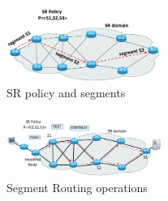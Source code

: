 \begin{figure}
    \centering
    \includegraphics[width=0.45\textwidth]{fig/sr-domain-simple.pdf}
    \caption{SR policy and segments}
    \label{fig:sr_policy_and_segments}
    \vspace{-3ex}
\end{figure}


\begin{figure}
    \centering
    \includegraphics[width=0.45\textwidth]{fig/sr-domain.pdf}
    \caption{Segment Routing operations}
    \label{fig:sr_operations}
    \vspace{-3ex}
\end{figure}

